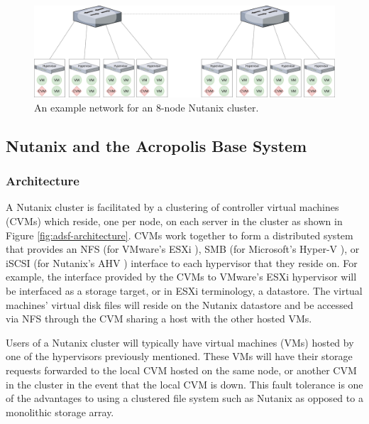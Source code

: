 \documentclass[12pt]{article}
\begin{document}
  \begin{figure}[htbp]
    \centering
    \includegraphics[scale=0.19]{images/network_diagram.png} 
    \caption{An example network for an 8-node Nutanix cluster.}
    \label{fig:adsf-network}
  \end{figure}

  \subsection{Nutanix and the Acropolis Base System} \label{sssec:abs}

    \subsubsection{Architecture}

    A Nutanix cluster is facilitated by a clustering of controller virtual
    machines (CVMs) which reside, one per node, on each server in the cluster
    as shown in Figure \ref{fig:adsf-architecture}. CVMs work together to form
    a distributed system that provides an NFS (for VMware's ESXi
    \cite{esxi2008}), SMB (for Microsoft's Hyper-V \cite{hyperv2009}), or iSCSI
    (for Nutanix's AHV \cite{bible}) interface to each hypervisor that they
    reside on. For example, the interface provided by the CVMs to VMware's ESXi
    hypervisor will be interfaced as a storage target, or in ESXi terminology,
    a datastore. The virtual machines' virtual disk files will reside on the
    Nutanix datastore and be accessed via NFS through the CVM sharing a host
    with the other hosted VMs.

    Users of a Nutanix cluster will typically have virtual machines (VMs)
    hosted by one of the hypervisors previously mentioned. These VMs will have
    their storage requests forwarded to the local CVM hosted on the same node,
    or another CVM in the cluster in the event that the local CVM is down. This
    fault tolerance is one of the advantages to using a clustered file system
    such as Nutanix as opposed to a monolithic storage array.
    
\end{document}
